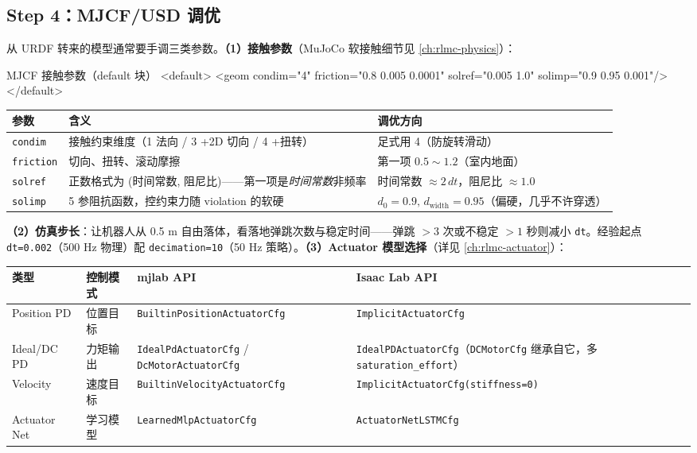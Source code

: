 \subsection{Step 4：MJCF/USD 调优}
\label{sec:rlmc-diy-pipe-tune}

从 URDF 转来的模型通常要手调三类参数。\textbf{（1）接触参数}（MuJoCo 软接触细节见 \cref{ch:rlmc-physics}）：

\begin{codebox}[text]{MJCF 接触参数（default 块）}
<default>
  <geom condim="4"
        friction="0.8 0.005 0.0001"
        solref="0.005 1.0"
        solimp="0.9 0.95 0.001"/>
</default>
\end{codebox}

\begin{center}
\small
\begin{tabular}{@{}lp{4.8cm}p{4.6cm}@{}}
\toprule
参数 & 含义 & 调优方向 \\
\midrule
\verb|condim| & 接触约束维度（1 法向 / 3 +2D 切向 / 4 +扭转） & 足式用 4（防旋转滑动） \\
\verb|friction| & 切向、扭转、滚动摩擦 & 第一项 $0.5\sim 1.2$（室内地面） \\
\verb|solref| & 正数格式为 (时间常数, 阻尼比)——第一项是\emph{时间常数}非频率 & 时间常数 $\approx 2\,dt$，阻尼比 $\approx 1.0$ \\
\verb|solimp| & 5 参阻抗函数，控约束力随 violation 的软硬 & $d_0{=}0.9,\,d_{\text{width}}{=}0.95$（偏硬，几乎不许穿透） \\
\bottomrule
\end{tabular}
\end{center}

\textbf{（2）仿真步长}：让机器人从 0.5 m 自由落体，看落地弹跳次数与稳定时间——弹跳 $>3$ 次或不稳定 $>1$ 秒则减小 \verb|dt|。经验起点 \verb|dt=0.002|（500 Hz 物理）配 \verb|decimation=10|（50 Hz 策略）。\textbf{（3）Actuator 模型选择}（详见 \cref{ch:rlmc-actuator}）：

\begin{center}
\small
\begin{tabular}{@{}lp{2.4cm}p{3.0cm}p{4.2cm}@{}}
\toprule
类型 & 控制模式 & mjlab API & Isaac Lab API \\
\midrule
Position PD & 位置目标 & \verb|BuiltinPositionActuatorCfg| & \verb|ImplicitActuatorCfg| \\
Ideal/DC PD & 力矩输出 & \verb|IdealPdActuatorCfg| / \verb|DcMotorActuatorCfg| & \verb|IdealPDActuatorCfg|（\verb|DCMotorCfg| 继承自它，多 \verb|saturation_effort|） \\
Velocity & 速度目标 & \verb|BuiltinVelocityActuatorCfg| & \verb|ImplicitActuatorCfg(stiffness=0)| \\
Actuator Net & 学习模型 & \verb|LearnedMlpActuatorCfg| & \verb|ActuatorNetLSTMCfg| \\
\bottomrule
\end{tabular}
\end{center}

